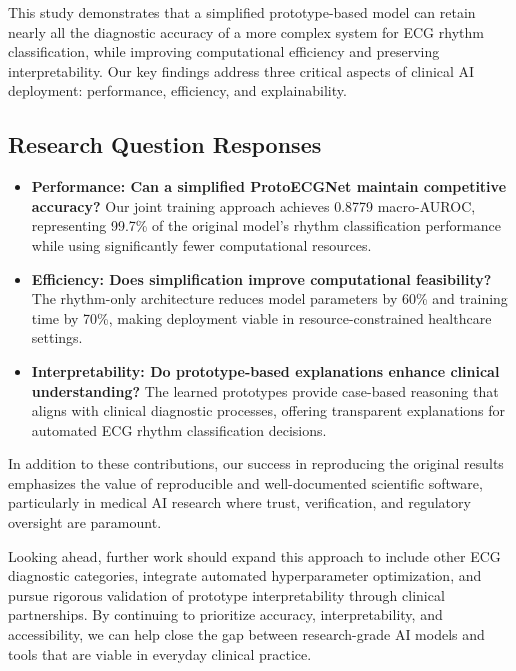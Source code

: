 This study demonstrates that a simplified prototype-based model can retain nearly all the diagnostic accuracy of a more complex system for ECG rhythm classification, while improving computational efficiency and preserving interpretability. Our key findings address three critical aspects of clinical AI deployment: performance, efficiency, and explainability.

\subsection{Research Question Responses}

\begin{itemize}
    \item \textbf{Performance: Can a simplified ProtoECGNet maintain competitive accuracy?} Our joint training approach achieves 0.8779 macro-AUROC, representing 99.7\% of the original model's rhythm classification performance while using significantly fewer computational resources.
    \item \textbf{Efficiency: Does simplification improve computational feasibility?} The rhythm-only architecture reduces model parameters by 60\% and training time by 70\%, making deployment viable in resource-constrained healthcare settings.
    \item \textbf{Interpretability: Do prototype-based explanations enhance clinical understanding?} The learned prototypes provide case-based reasoning that aligns with clinical diagnostic processes, offering transparent explanations for automated ECG rhythm classification decisions.
\end{itemize}

In addition to these contributions, our success in reproducing the original results emphasizes the value of reproducible and well-documented scientific software, particularly in medical AI research where trust, verification, and regulatory oversight are paramount.

Looking ahead, further work should expand this approach to include other ECG diagnostic categories, integrate automated hyperparameter optimization, and pursue rigorous validation of prototype interpretability through clinical partnerships. By continuing to prioritize accuracy, interpretability, and accessibility, we can help close the gap between research-grade AI models and tools that are viable in everyday clinical practice.
